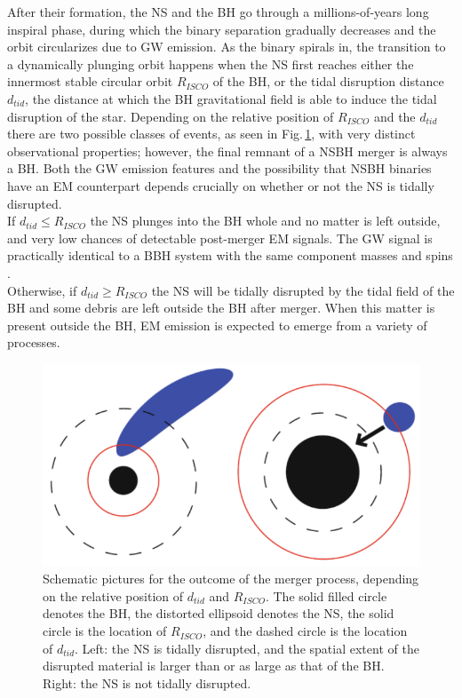 \documentclass[binding=0.6cm, LaM]{sapthesis}
\begin{document}
        After their formation, the NS and the BH go through a millions-of-years long inspiral phase,
        during which the binary separation gradually decreases and the orbit circularizes due to GW emission.
        As the binary spirals in, the transition to a dynamically plunging orbit happens
        when the NS first reaches either the innermost stable circular orbit $R_{ISCO}$ of the BH, or the tidal disruption distance $d_{tid}$,
        the distance at which the BH gravitational field is able to induce the tidal disruption of the star.
        Depending on the relative position of $R_{ISCO}$ and the $d_{tid}$ there are
        two possible classes of events, as seen in Fig.\,\ref{fig:nsbh}, with very distinct observational properties;
        however, the final remnant of a NSBH merger is always a BH.
        Both the GW emission features and the possibility that NSBH binaries have an EM counterpart
        depends crucially on whether or not the NS is tidally disrupted. \\
        If $d_{tid} \leq R_{ISCO}$ the NS plunges into the BH whole and no matter is left outside,
        and very low chances of detectable post-merger EM signals.
        The GW signal is practically identical to a BBH system with the same component masses and spins \cite{}. \\
        Otherwise, if $d_{tid} \geq R_{ISCO}$ the NS will be tidally disrupted by the tidal field of the BH
        and some debris are left outside the BH after merger.
        When this matter is present outside the BH, EM emission is expected to emerge from a variety of processes.
                 \begin{figure}[H]
                        \label{nsbh}
                        \includegraphics[scale=0.45]{nsbh}
                        \centering
                        \caption{Schematic pictures for the outcome of the merger process, depending on the relative position of $d_{tid}$ and $R_{ISCO}$. The solid filled circle denotes the BH, the distorted ellipsoid denotes the NS, the solid circle is the location of $R_{ISCO}$, and the dashed circle is the location of  $d_{tid}$. Left: the NS is tidally disrupted, and the spatial extent of the disrupted material is larger than or as large as that of the BH. Right: the NS is not tidally disrupted.}
                         \label{fig:nsbh}
                \end{figure}
\end{document}
